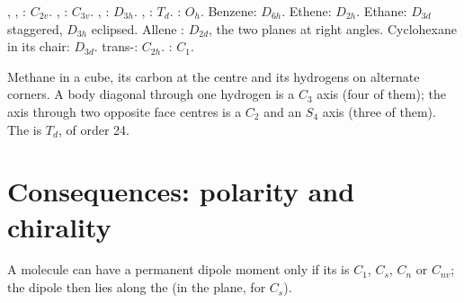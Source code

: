 \begin{example}[A gallery]\label{ex:b3:point-groups:gallery}
, , : $C_{2v}$. , : $C_{3v}$. ,
: $D_{3h}$. , : $T_d$. : $O_h$. Benzene: $D_{6h}$.
Ethene: $D_{2h}$. Ethane: $D_{3d}$ staggered, $D_{3h}$ eclipsed. Allene
: $D_{2d}$, the two  planes at right angles. Cyclohexane
in its chair: $D_{3d}$. trans-: $C_{2h}$. : $C_1$.
\end{example}

\begin{omfigure}

{\small Methane in a cube, its carbon at the centre and its hydrogens on
alternate corners. A body diagonal through one hydrogen is a $C_3$ axis
(four of them); the axis through two opposite face centres is a $C_2$ and an
$S_4$ axis (three of them). The  is $T_d$, of order 24.}
\end{omfigure}

\section{Consequences: polarity and chirality}

\begin{theorem}\label{thm:b3:point-groups:polar}
A molecule can have a permanent dipole moment only if its  is
$C_1$, $C_s$, $C_n$ or $C_{nv}$; the dipole then lies along the 
(in the plane, for $C_s$).
\end{theorem}

